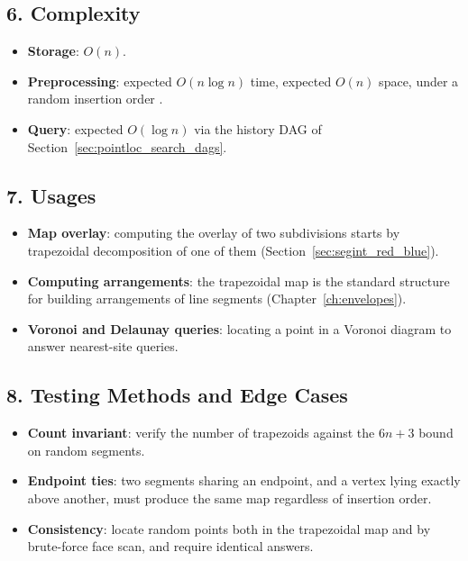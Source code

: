 \subsection{6. Complexity}

\begin{itemize}
\item \textbf{Storage}: $O(n)$.
\item \textbf{Preprocessing}: expected $O(n \log n)$ time, expected $O(n)$
  space, under a random insertion order \cite{seidel1991,berg2008}.
\item \textbf{Query}: expected $O(\log n)$ via the history DAG of
  Section~\ref{sec:pointloc_search_dags}.
\end{itemize}

\subsection{7. Usages}

\begin{itemize}
\item \textbf{Map overlay}: computing the overlay of two subdivisions
  starts by trapezoidal decomposition of one of them
  (Section~\ref{sec:segint_red_blue}).
\item \textbf{Computing arrangements}: the trapezoidal map is the standard
  structure for building arrangements of line segments
  (Chapter~\ref{ch:envelopes}).
\item \textbf{Voronoi and Delaunay queries}: locating a point in a Voronoi
  diagram to answer nearest-site queries.
\end{itemize}

\subsection{8. Testing Methods and Edge Cases}

\begin{itemize}
\item \textbf{Count invariant}: verify the number of trapezoids against the
  $6n+3$ bound on random segments.
\item \textbf{Endpoint ties}: two segments sharing an endpoint, and a
  vertex lying exactly above another, must produce the same map regardless
  of insertion order.
\item \textbf{Consistency}: locate random points both in the trapezoidal
  map and by brute-force face scan, and require identical answers.
\end{itemize}

